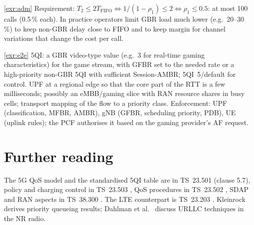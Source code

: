 \documentclass[11pt,a4paper]{article}
\begin{document}
\begin{solutionbox}{\ref{exr:adm}}
Requirement: $T_2 \le 2T_{\mathrm{FIFO}} \Leftrightarrow 1/(1-\rho_1) \le 2 \Leftrightarrow \rho_1 \le 0.5$: at most 100 calls (0.5\,\% each). In practice operators limit GBR load
much lower (e.g.\ 20--30\,\%) to keep non-GBR delay close to FIFO and to keep margin for channel variations that change the cost per call.
\end{solutionbox}

\begin{solutionbox}{\ref{exr:e2e}}
5QI: a GBR video-type value (e.g.\ 3 for real-time gaming characteristics) for the game stream, with GFBR set to the needed rate or a high-priority non-GBR 5QI with
sufficient Session-AMBR; 5QI~5/default for control. UPF at a regional edge so that the core part of the RTT is a few milliseconds; possibly an eMBB/gaming slice with
RAN resource shares in busy cells; transport mapping of the flow to a priority class. Enforcement: UPF (classification, MFBR, AMBR), gNB (GFBR, scheduling priority,
PDB), UE (uplink rules); the PCF authorises it based on the gaming provider's AF request.
\end{solutionbox}

\section{Further reading}
The 5G QoS model and the standardised 5QI table are in TS~23.501 \cite{ts23501} (clause 5.7), policy and charging control in TS~23.503 \cite{ts23503}, QoS
procedures in TS~23.502 \cite{ts23502}, SDAP and RAN aspects in TS~38.300 \cite{ts38300}. The LTE counterpart is TS~23.203 \cite{ts23203}. Kleinrock
\cite{kleinrock1975queueing} derives priority queueing results; Dahlman et al.\ \cite{dahlman2020nr} discuss URLLC techniques in the NR radio.

\printbibliography[heading=subbibliography,title={\ACNstrRefs}]
\end{document}
